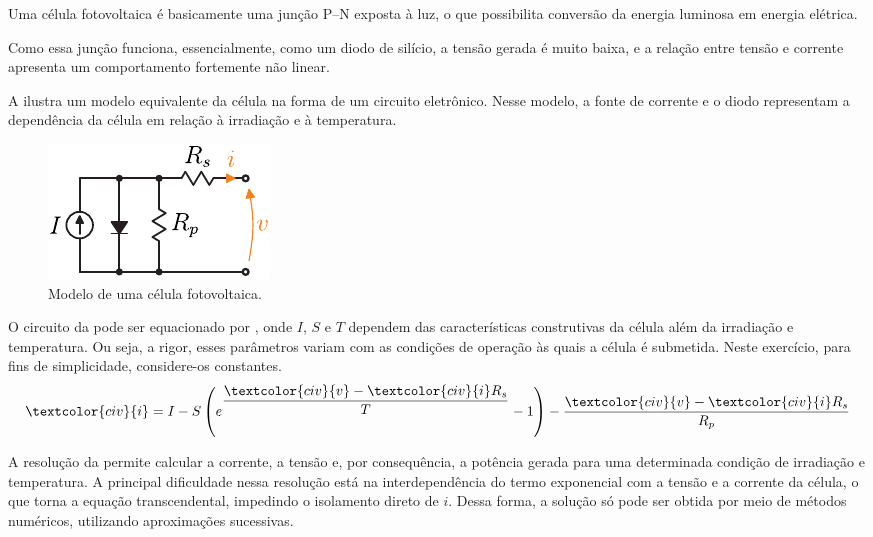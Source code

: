 Uma célula fotovoltaica é basicamente uma junção P–N exposta à luz, o que possibilita conversão da energia
luminosa em energia elétrica.

Como essa junção funciona, essencialmente, como um diodo de silício, a tensão gerada é muito baixa, e a relação entre
tensão e corrente apresenta um comportamento fortemente não linear.


A  ilustra um modelo equivalente da célula na forma de um circuito eletrônico.
Nesse modelo, a fonte de corrente e o diodo representam a dependência da célula em relação à irradiação e à temperatura.
\begin{figure}[htbp]
    \centering
    \includegraphics[scale=0.9]{figs/cell}
    \caption{Modelo de uma célula fotovoltaica.}
    \label{fig:cell}
\end{figure}

O circuito da  pode ser equacionado por , onde $I$, $S$ e $T$ dependem das
características construtivas da célula além da irradiação e temperatura.
Ou seja, a rigor, esses parâmetros variam com as condições de operação às quais a célula é submetida.
Neste exercício, para fins de simplicidade, considere-os constantes.
\begin{equation}
    \textcolor{civ}{i} = I - S \left(
    e^{\dfrac{\textcolor{civ}{v} -\textcolor{civ}{i}  R_s}{T}} - 1
    \right) - \dfrac{\textcolor{civ}{v} -\textcolor{civ}{i}  R_s}{R_p}
    \label{eq:cell}
\end{equation}

A resolução da  permite calcular a corrente, a tensão e, por consequência, a potência gerada para uma
determinada condição de irradiação e temperatura.
A principal dificuldade nessa resolução está na interdependência do termo exponencial com a tensão e a corrente da
célula, o que torna a equação transcendental, impedindo o isolamento direto de $i$.
Dessa forma, a solução só pode ser obtida por meio de métodos numéricos, utilizando aproximações sucessivas.

